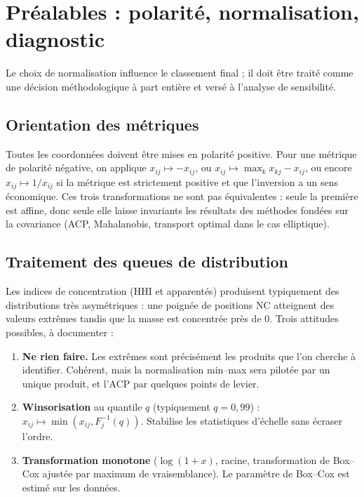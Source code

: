 \documentclass[11pt,a4paper]{article}
\theoremstyle{definition}
\theoremstyle{remark}
\begin{document}
\section{Préalables : polarité, normalisation, diagnostic}
\label{sec:prealables}

\medskip

Le choix de normalisation influence le
classement final ; il doit
être traité comme une décision méthodologique à part entière et versé à l'analyse de sensibilité.

\bigskip

\subsection{Orientation des métriques}

\medskip

Toutes les coordonnées doivent être mises en polarité positive. Pour une métrique de polarité
négative, on applique $x_{ij} \mapsto -x_{ij}$, ou $x_{ij} \mapsto \max_k x_{kj} - x_{ij}$, ou
encore $x_{ij}\mapsto 1/x_{ij}$ si la métrique est strictement positive et que l'inversion a un
sens économique. Ces trois transformations ne sont pas équivalentes : seule la première est
affine, donc seule elle laisse invariants les résultats des méthodes fondées sur la covariance
(ACP, Mahalanobis, transport optimal dans le cas elliptique).

\bigskip

\subsection{Traitement des queues de distribution}

\medskip

Les indices de concentration (HHI et apparentés) produisent typiquement des distributions très
asymétriques : une poignée de positions NC atteignent des valeurs extrêmes tandis que la masse est
concentrée près de $0$. Trois attitudes possibles, à documenter :

\medskip

\begin{enumerate}[nosep,leftmargin=1.6em]
  \item \textbf{Ne rien faire.} Les extrêmes sont précisément les produits que l'on cherche à
  identifier. Cohérent, mais la normalisation min--max sera pilotée par un unique produit, et
  l'ACP par quelques points de levier.
  \item \textbf{Winsorisation} au quantile $q$ (typiquement $q = 0{,}99$) : $x_{ij} \mapsto
  \min(x_{ij}, F_j^{-1}(q))$. Stabilise les statistiques d'échelle sans écraser l'ordre.
  \item \textbf{Transformation monotone} ($\log(1+x)$, racine, transformation de Box--Cox
  ajustée par maximum de vraisemblance). Le paramètre de Box--Cox est estimé sur les données.
\end{enumerate}
\end{document}
